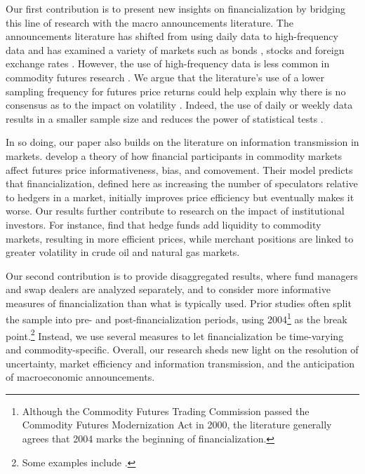 Our first contribution is to present new insights on financialization by bridging this line of research with the macro announcements literature. The announcements literature has shifted from using daily data to high-frequency data and has examined a variety of markets such as bonds \citep{andersen2007real, hu2013noise, balduzzi2001economic,lee1995oil, hautsch2011impact, kurov2019price}, stocks \citep{andersen2007real,bernile2016can,kurov2019price} and foreign exchange rates \citep{lee1995oil,andersen2003micro}. However, the use of high-frequency data is less common in commodity futures research \citep{couleau2020corn}. We argue that the literature's use of a lower sampling frequency for futures price returns could help explain why there is no  consensus as to the impact on volatility \citep*{tang2012index,brunetti2016speculators,irwin2012testing,stoll2010commodity,alquist2013role}. Indeed, the use of daily or weekly data results in a smaller sample size and reduces the power of statistical tests \citep*{irwin2009devil}.  

In so doing, our paper also builds on the literature on information transmission in markets. \citet*{goldstein2022commodity} develop a theory of how financial participants in commodity markets affect futures price informativeness, bias, and comovement. Their model predicts that financialization, defined here as increasing the number of  speculators relative to  hedgers in a  market, initially improves price efficiency but eventually makes it worse. Our results further contribute to research on the impact of institutional investors. For instance, \citet*{brunetti2016speculators} find that hedge funds add liquidity to commodity markets, resulting in more efficient prices, while merchant positions are linked to greater volatility in crude oil and natural gas markets.


Our second contribution is to provide disaggregated results, where fund managers and swap dealers are analyzed separately, and to consider more informative measures of financialization than what is typically used.   Prior studies often split the sample into pre- and post-financialization periods, using 2004\footnote{Although the Commodity Futures Trading Commission passed the Commodity Futures Modernization Act in 2000, the literature generally agrees that 2004 marks the beginning of financialization.}   as  the break point.\footnote{Some examples include \citet{buyukcsahin2010matters, kilian2014role,brunetti2016speculators,irwin2012financialization,stoll2010commodity,alquist2013role}.} Instead, we use several measures to let financialization be time-varying and commodity-specific.   Overall, our research sheds new light on the resolution of uncertainty, market efficiency and information transmission, and the anticipation of macroeconomic announcements. 



